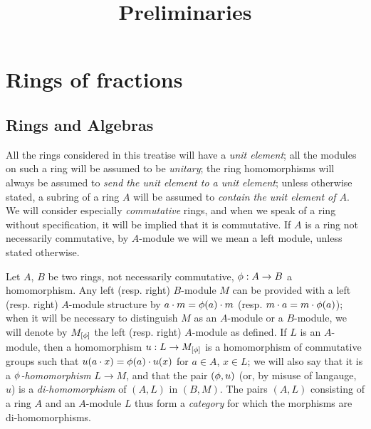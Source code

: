 


\title{Preliminaries}
\maketitle

\label{section-phantom}

\tableofcontents

\section{Rings of fractions}
\label{section-rings-of-fractions}

\setcounter{subsection}{-1}
\subsection{Rings and Algebras}
\label{subsection-rings-and-algs}

\begin{env}[1.0.1]
\label{env-0.1.0.1}
All the rings considered in this treatise will have a {\em unit element}; all
the modules on such a ring will be assumed to be {\em unitary}; the ring
homomorphisms will always be assumed to {\em send the unit element to a unit
element}; unless otherwise stated, a subring of a ring $A$ will be assumed to
{\em contain the unit element of $A$}. We will consider especially
{\em commutative} rings, and when we speak of a ring without specification, it
will be implied that it is commutative. If $A$ is a ring not necessarily
commutative, by $A$-module we will we mean a left module, unless stated
otherwise.
\end{env}

\begin{env}[1.0.2]
\label{env-0.1.0.2}
Let $A$, $B$ be two rings, not necessarily commutative, $\phi:A\to B$ a
homomorphism. Any left (resp. right) $B$-module $M$ can be provided with a left
(resp. right) $A$-module structure by $a\cdot m=\phi(a)\cdot m$
(resp. $m\cdot a=m\cdot\phi(a)$); when it will be necessary to distinguish $M$
as an $A$-module or a $B$-module, we will denote by $M_{[\phi]}$ the left
(resp. right) $A$-module as defined. If $L$ is an $A$-module, then a
homomorphism $u:L\to M_{[\phi]}$ is a homomorphism of commutative groups such
that $u(a\cdot x)=\phi(a)\cdot u(x)$ for $a\in A$, $x\in L$; we will also say
that it is a {\em $\phi$-homomorphism} $L\to M$, and that the pair $(\phi,u)$
(or, by misuse of langauge, $u$) is a {\em di-homomorphism} of $(A,L)$ in
$(B,M)$. The pairs $(A,L)$ consisting of a ring $A$ and an $A$-module $L$ thus
form a {\em category} for which the morphisms are di-homomorphisms.
\end{env}


